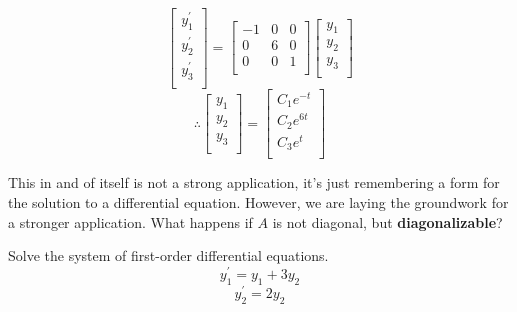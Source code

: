 \begin{solution}
\[
    \begin{bmatrix}
         y_1^{\prime}  \\
          y_2^{\prime} \\
          y_3^{\prime} \\
    \end{bmatrix} = \begin{bmatrix}
        -1 &0  &0   \\
         0&6  &0   \\
         0&0  &1   \\
    \end{bmatrix}\begin{bmatrix}
        y_1  \\
          y_2\\
          y_3\\
    \end{bmatrix}
\]
\[
    \therefore \begin{bmatrix}
         y_1 \\
          y_2\\
          y_3\\
    \end{bmatrix}=\begin{bmatrix}
         C_1e^{-t}  \\
          C_2e^{6t} \\
          C_3e^t\\
    \end{bmatrix}
\]
\end{solution}
\begin{remark}
    This in and of itself is not a strong application, it's just remembering a form for the solution to a differential equation. However, we are laying the groundwork for a stronger application. What happens if \(A\) is not diagonal, but \textbf{diagonalizable}?
\end{remark}
\begin{exercise}
    Solve the system of first-order differential equations.
    \[
        y_1^{\prime} =y_1 +3y_2
    \]
    \[
        y_2^{\prime} =2y_2
    \]
\end{exercise}
